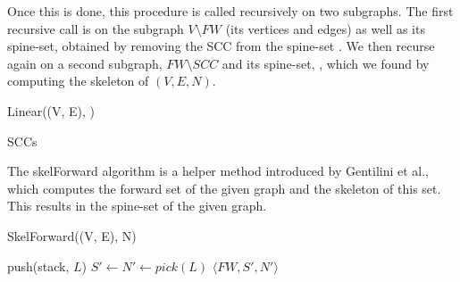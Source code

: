 \documentclass[../master/master.tex]{subfiles}
\begin{document}
Once this is done, this procedure is called recursively on two subgraphs. The first recursive call is on the subgraph $V\setminus FW$ (its vertices and edges) as well as its spine-set, obtained by removing the SCC from the spine-set . We then recurse again on a second subgraph, $FW\setminus SCC$ and its spine-set, , which we found by computing the skeleton of $(V, E, N)$.

\begin{algorithm}[h!]
  \caption{Linear((V, E), )}
  \begin{algorithmic}[1]
     \State \Return
    \EndIf
    \Statex
    \EndIf
    \Statex
    \Statex
    \EndWhile
    \Statex
    \Statex
    \Statex
    \State \Return SCCs
  \end{algorithmic}
\end{algorithm}

The skelForward algorithm is a helper method introduced by Gentilini et al., which computes the forward set of the given graph and the skeleton of this set. This results in the spine-set of the given graph.

\begin{algorithm}[H]
  \caption{SkelForward((V, E), N)}
  \begin{algorithmic}[1]
    \Statex
    \State push(stack, $L$)
    \EndWhile
    \Statex
    \State $S' \gets N' \gets pick(L)$
    \EndWhile
    \Statex
    \State \Return $\langle FW, S', N' \rangle$
  \end{algorithmic}
\end{algorithm}
\end{document}
